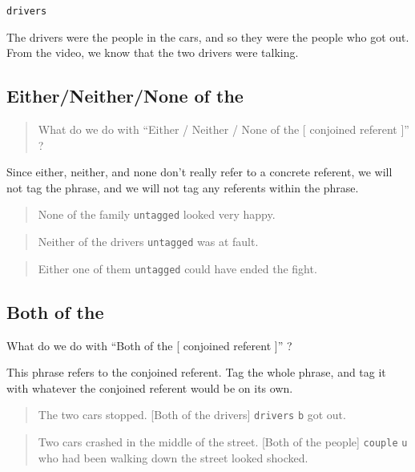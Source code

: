 \documentclass[
]{book}
\begin{document}
\texttt{drivers}

The drivers were the people in the cars,
and so they were the people who got out.
From the video, we know that the two drivers were talking.

\hypertarget{eitherneithernone-of-the}{%
\subsection{Either/Neither/None of the}\label{eitherneithernone-of-the}}

\begin{quote}
What do we do with
``Either / Neither / None of the {[} conjoined referent {]}'' ?
\end{quote}

Since either, neither, and none don't really refer to a concrete referent,
we will not tag the phrase,
and we will not tag any referents within the phrase.

\begin{quote}
None of the family \texttt{untagged} looked very happy.
\end{quote}

\begin{quote}
Neither of the drivers \texttt{untagged} was at fault.
\end{quote}

\begin{quote}
Either one of them \texttt{untagged} could have ended the fight.
\end{quote}

\hypertarget{both-of-the}{%
\subsection{Both of the}\label{both-of-the}}

What do we do with ``Both of the {[} conjoined referent {]}'' ?

This phrase refers to the conjoined referent. Tag the whole phrase, and tag it with whatever the conjoined referent would be on its own.

\begin{quote}
The two cars stopped.
{[}Both of the drivers{]} \texttt{drivers} \texttt{b} got out.
\end{quote}

\begin{quote}
Two cars crashed in the middle of the street.
{[}Both of the people{]} \texttt{couple} \texttt{u} who had been walking down the street looked shocked.
\end{quote}
\end{document}
